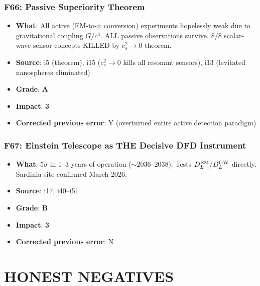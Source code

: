 \documentclass[11pt,a4paper]{article}
\newcommand{\grade}[1]{\textbf{#1}}
\newcommand{\impact}[1]{\textbf{#1}}
\begin{document}
\section{F66: Passive Superiority Theorem}
\begin{itemize}[nosep]
\item \textbf{What}: All active (EM-to-$\psi$ conversion) experiments hopelessly weak due to gravitational coupling $G/c^4$. ALL passive observations survive. 8/8 scalar-wave sensor concepts KILLED by $c_s^2 \to 0$ theorem.
\item \textbf{Source}: i5 (theorem), i15 ($c_s^2 \to 0$ kills all resonant sensors), i13 (levitated nanospheres eliminated)
\item \textbf{Grade}: \grade{A}
\item \textbf{Impact}: \impact{3}
\item \textbf{Corrected previous error}: Y (overturned entire active detection paradigm)
\end{itemize}

\section{F67: Einstein Telescope as THE Decisive DFD Instrument}
\begin{itemize}[nosep]
\item \textbf{What}: $5\sigma$ in 1--3 years of operation ($\sim 2036$--2038). Tests $D_L^{\rm EM}/D_L^{\rm GW}$ directly. Sardinia site confirmed March 2026.
\item \textbf{Source}: i17, i40--i51
\item \textbf{Grade}: \grade{B}
\item \textbf{Impact}: \impact{3}
\item \textbf{Corrected previous error}: N
\end{itemize}


\part{HONEST NEGATIVES}
\label{part:negatives}
\end{document}
